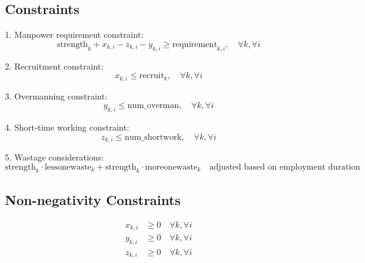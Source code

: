 \documentclass{article}
\begin{document}
\subsection*{Constraints}
1. Manpower requirement constraint:
\begin{equation}
\text{strength}_{k} + x_{k,i} - z_{k,i} - y_{k,i} \geq \text{requirement}_{k,i}, \quad \forall k, \forall i
\end{equation}

2. Recruitment constraint:
\begin{equation}
x_{k,i} \leq \text{recruit}_{k}, \quad \forall k, \forall i
\end{equation}

3. Overmanning constraint:
\begin{equation}
y_{k,i} \leq \text{num\_overman}, \quad \forall k, \forall i
\end{equation}

4. Short-time working constraint:
\begin{equation}
z_{k,i} \leq \text{num\_shortwork}, \quad \forall k, \forall i
\end{equation}

5. Wastage considerations:
\begin{equation}
\text{strength}_{k} \cdot \text{lessonewaste}_{k} + \text{strength}_{k} \cdot \text{moreonewaste}_{k} \quad \text{adjusted based on employment duration}
\end{equation}

\subsection*{Non-negativity Constraints}
\begin{align*}
x_{k,i} & \geq 0 \quad \forall k, \forall i \\
y_{k,i} & \geq 0 \quad \forall k, \forall i \\
z_{k,i} & \geq 0 \quad \forall k, \forall i
\end{align*}
\end{document}
